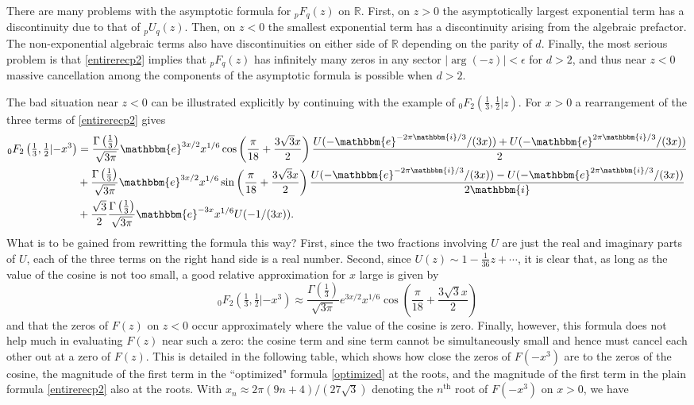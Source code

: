 \documentclass[12pt]{article}
\newcommand{\ee}[0] {\mathbbm{e}}
\newcommand{\ii}[0] {\mathbbm{i}}
\numberwithin{equation}{section}
\newcommand{\FFf}[5] {{}_{#1}{#2}_{#3} \left(#4 | {#5} \right)}
\begin{document}
There are many problems with the asymptotic formula for ${}_p F_{q}(z)$ on $\mathbb{R}$. First, on $z>0$ the asymptotically largest exponential term has a discontinuity due to that of ${}_p U_{q}(z)$. Then, on $z<0$ the smallest exponential term has a discontinuity arising from the algebraic prefactor. The non-exponential algebraic terms also have discontinuities on either side of $\mathbb{R}$ depending on the parity of $d$. Finally, the most serious problem is that \eqref{entirerecp2} implies that ${}_p F_{q}(z)$ has infinitely many zeros in any sector $|\arg(-z)| < \epsilon$ for $d>2$, and thus near $z<0$ massive cancellation among the components of the asymptotic formula is possible when $d>2$.

The bad situation near $z<0$ can be illustrated explicitly by continuing with the example of $\FFf{0}{F}{2}{\tfrac{1}{3},\tfrac{1}{2}}{z}$. For $x>0$ a rearrangement of the three terms of \eqref{entirerecp2} gives
\begin{equation}
\label{optimized}
\begin{aligned}
\FFf{0}{F}{2}{\tfrac{1}{3},\tfrac{1}{2}}{-x^3} &= \frac{\Gamma\left(\frac{1}{3}\right)}{\sqrt{3 \pi }} \ee^{3 x/2} x^{1/6} \cos \left(\frac{\pi}{18} + \frac{3 \sqrt{3}
   x}{2}\right)\frac{U(-\ee^{-2 \pi \ii/3}/(3x))+U(-\ee^{2 \pi \ii/3}/(3x))}{2}\\
&+\frac{\Gamma\left(\frac{1}{3}\right)}{\sqrt{3 \pi }} \ee^{3 x/2} x^{1/6} \sin \left(\frac{\pi }{18} + \frac{3 \sqrt{3}
   x}{2}\right)
   \frac{U(-\ee^{-2\pi \ii/3}/(3x))-U(-\ee^{2\pi \ii/3}/(3x))}{2\ii}\\
 &+\frac{\sqrt{3}}{2} \frac{\Gamma\left(\frac{1}{3}\right)}{\sqrt{3 \pi }} \ee^{-3x} x^{1/6} U(-1/(3x))
\text{.}
\end{aligned}
\end{equation}
What is to be gained from rewritting the formula this way? First, since the two fractions involving $U$ are just the real and imaginary parts of $U$, each of the three terms on the right hand side is a real number. Second, since $U(z) \sim 1-\frac{1}{36}z + \cdots$, it is clear that, as long as the value of the cosine is not too small, a good relative approximation for $x$ large is given by
\begin{equation*}
\FFf{0}{F}{2}{\tfrac{1}{3},\tfrac{1}{2}}{-x^3} \approx \frac{\Gamma\left(\frac{1}{3}\right)}{\sqrt{3 \pi }} e^{3 x/2} x^{1/6}
   \cos \left(\frac{\pi }{18} + \frac{3 \sqrt{3}
   x}{2}\right)
\end{equation*}
and that the zeros of $F(z)$ on $z<0$ occur approximately where the value of the cosine is zero. Finally, however, this formula does not help much in evaluating $F(z)$ near such a zero: the cosine term and sine term cannot be simultaneously small and hence must cancel each other out at a zero of $F(z)$. This is detailed in the following table, which shows how close the zeros of $F(-x^3)$ are to the zeros of the cosine, the magnitude of the first term in the ``optimized" formula \eqref{optimized} at the roots, and the magnitude of the first term in the plain formula \eqref{entirerecp2} also at the roots. With $x_n \approx 2\pi(9n+4)/(27 \sqrt{3})$ denoting the $n^{\text{th}}$ root of $F(-x^3)$ on $x>0$, we have
\end{document}

